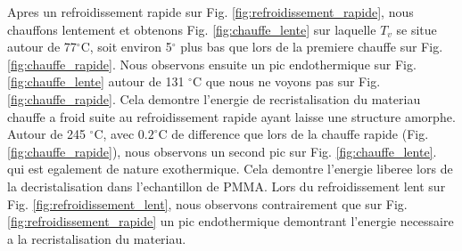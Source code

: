 Apres un refroidissement rapide sur Fig. \ref{fig:refroidissement_rapide}, nous chauffons lentement et obtenons Fig. \ref{fig:chauffe_lente} sur laquelle $T_v$ se situe autour de 77$^\circ$C, soit environ 5$^\circ$ plus bas que lors de la premiere chauffe sur Fig. \ref{fig:chauffe_rapide}. Nous observons ensuite un pic endothermique sur Fig. \ref{fig:chauffe_lente} autour de 131 $^\circ$C que nous ne voyons pas sur Fig. \ref{fig:chauffe_rapide}. Cela demontre l'energie de recristalisation du materiau chauffe a froid suite au refroidissement rapide ayant laisse une structure amorphe. Autour de 245 $^\circ$C, avec $0.2 ^\circ$C de difference que lors de la chauffe rapide (Fig. \ref{fig:chauffe_rapide}), nous observons un second pic sur Fig. \ref{fig:chauffe_lente}. qui est egalement de nature exothermique. Cela demontre l'energie liberee lors de la decristalisation dans l'echantillon de PMMA. Lors du refroidissement lent sur Fig. \ref{fig:refroidissement_lent}, nous observons contrairement que sur Fig. \ref{fig:refroidissement_rapide} un pic endothermique demontrant l'energie necessaire a la recristalisation du materiau.
